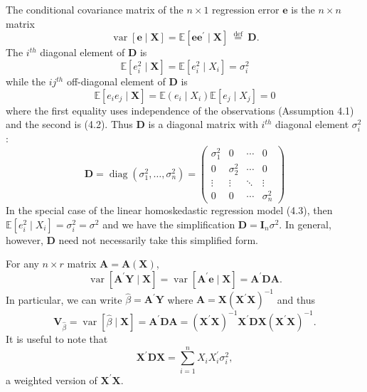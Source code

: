 \documentclass[10pt]{article}
\begin{document}
The conditional covariance matrix of the $n \times 1$ regression error $\boldsymbol{e}$ is the $n \times n$ matrix
$$
\operatorname{var}[\boldsymbol{e} \mid \boldsymbol{X}]=\mathbb{E}\left[\boldsymbol{e} \boldsymbol{e}^{\prime} \mid \boldsymbol{X}\right] \stackrel{\text { def }}{=} \boldsymbol{D} .
$$
The $i^{t h}$ diagonal element of $\boldsymbol{D}$ is
$$
\mathbb{E}\left[e_{i}^{2} \mid \boldsymbol{X}\right]=\mathbb{E}\left[e_{i}^{2} \mid X_{i}\right]=\sigma_{i}^{2}
$$
while the $i j^{t h}$ off-diagonal element of $\boldsymbol{D}$ is
$$
\mathbb{E}\left[e_{i} e_{j} \mid \boldsymbol{X}\right]=\mathbb{E}\left(e_{i} \mid X_{i}\right) \mathbb{E}\left[e_{j} \mid X_{j}\right]=0
$$
where the first equality uses independence of the observations (Assumption 4.1) and the second is (4.2). Thus $\boldsymbol{D}$ is a diagonal matrix with $i^{t h}$ diagonal element $\sigma_{i}^{2}$ :
$$
\boldsymbol{D}=\operatorname{diag}\left(\sigma_{1}^{2}, \ldots, \sigma_{n}^{2}\right)=\left(\begin{array}{cccc}
\sigma_{1}^{2} & 0 & \cdots & 0 \\
0 & \sigma_{2}^{2} & \cdots & 0 \\
\vdots & \vdots & \ddots & \vdots \\
0 & 0 & \cdots & \sigma_{n}^{2}
\end{array}\right)
$$
In the special case of the linear homoskedastic regression model (4.3), then $\mathbb{E}\left[e_{i}^{2} \mid X_{i}\right]=\sigma_{i}^{2}=\sigma^{2}$ and we have the simplification $\boldsymbol{D}=\boldsymbol{I}_{n} \sigma^{2}$. In general, however, $\boldsymbol{D}$ need not necessarily take this simplified form.

For any $n \times r$ matrix $\boldsymbol{A}=\boldsymbol{A}(\boldsymbol{X})$,
$$
\operatorname{var}\left[\boldsymbol{A}^{\prime} \boldsymbol{Y} \mid \boldsymbol{X}\right]=\operatorname{var}\left[\boldsymbol{A}^{\prime} \boldsymbol{e} \mid \boldsymbol{X}\right]=\boldsymbol{A}^{\prime} \boldsymbol{D} \boldsymbol{A} .
$$
In particular, we can write $\widehat{\beta}=\boldsymbol{A}^{\prime} \boldsymbol{Y}$ where $\boldsymbol{A}=\boldsymbol{X}\left(\boldsymbol{X}^{\prime} \boldsymbol{X}\right)^{-1}$ and thus
$$
\boldsymbol{V}_{\widehat{\beta}}=\operatorname{var}[\widehat{\beta} \mid \boldsymbol{X}]=\boldsymbol{A}^{\prime} \boldsymbol{D} \boldsymbol{A}=\left(\boldsymbol{X}^{\prime} \boldsymbol{X}\right)^{-1} \boldsymbol{X}^{\prime} \boldsymbol{D} \boldsymbol{X}\left(\boldsymbol{X}^{\prime} \boldsymbol{X}\right)^{-1} .
$$
It is useful to note that
$$
\boldsymbol{X}^{\prime} \boldsymbol{D} \boldsymbol{X}=\sum_{i=1}^{n} X_{i} X_{i}^{\prime} \sigma_{i}^{2},
$$
a weighted version of $\boldsymbol{X}^{\prime} \boldsymbol{X}$.
\end{document}
